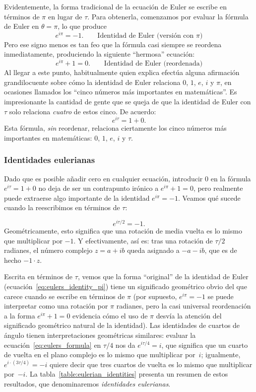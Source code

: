 Evidentemente, la forma tradicional de la ecuación de Euler se escribe en términos de $\pi$ en lugar de $\tau$. Para obtenerla, comenzamos por evaluar la fórmula de Euler en $\theta = \pi$, lo que produce
\begin{equation}
\label{eq:eulers_identity_pi}
e^{i\pi} = -1. \qquad\mbox{Identidad de Euler (versión con $\pi$)}
\end{equation}
Pero ese signo menos es tan feo que la fórmula casi siempre se reordena inmediatamente, produciendo la siguiente ``hermosa'' ecuación:
\[ e^{i\pi} + 1 = 0. \qquad\mbox{Identidad de Euler (reordenada)} \]
Al llegar a este punto, habitualmente quien explica efectúa alguna afirmación grandilocuente sobre cómo la identidad de Euler relaciona $0$, $1$, $e$, $i$ y $\pi$, en ocasiones llamados los ``cinco números más importantes en matemáticas''. Es impresionante la cantidad de gente que se queja de que la identidad de Euler con $\tau$ solo relaciona \emph{cuatro} de estos cinco. De acuerdo:
\[ e^{i\tau} = 1 + 0. \]
Esta fórmula, \emph{sin} reordenar, relaciona ciertamente los cinco números más importantes en matemáticas: $0$, $1$, $e$, $i$ y $\tau$.

      \subsubsection{Identidades eulerianas} %
      \label{sec:eulerian_identities}

Dado que es posible añadir cero en cualquier ecuación, introducir $0$ en la fórmula $e^{i\tau} = 1 + 0$ no deja de ser un contrapunto irónico a $e^{i\pi} + 1 = 0$, pero realmente puede extraerse algo importante de la identidad $e^{i\pi} = -1$. Veamos qué sucede cuando la reescribimos en términos de $\tau$:

\[
e^{i\tau/2} = -1.
\]
Geométricamente, esto significa que una rotación de media vuelta es lo mismo que multiplicar por $-1$. Y efectivamente, así es: tras una rotación de $\tau/2$ radianes, el número complejo $z = a + ib$ queda asignado a $-a - ib$, que es de hecho $-1\cdot z$.

Escrita en términos de $\tau$, vemos que la forma ``original'' de la identidad de Euler (ecuación~\eqref{eq:eulers_identity_pi}) tiene un significado geométrico obvio del que carece cuando se escribe en términos de $\pi$ (por supuesto, $e^{i\pi} = -1$ se puede interpretar como una rotación por $\pi$ radianes, pero la casi universal reordenación a la forma $e^{i\pi} + 1 = 0$ evidencia cómo el uso de $\pi$ desvía la atención del significado geométrico natural de la identidad). Las identidades de cuartos de ángulo tienen interpretaciones geométricas similares: evaluar la ecuación~\eqref{eq:eulers_formula} en $\tau/4$ nos da $e^{i\tau/4} = i$, que significa que un cuarto de vuelta en el plano complejo es lo mismo que multiplicar por~$i$; igualmente, $e^{i\cdot(3\tau/4)} = -i$ quiere decir que tres cuartos de vuelta es lo mismo que multiplicar por~$-i$. La tabla~\ref{table:eulerian_identities} presenta un resumen de estos resultados, que denominaremos \emph{identidades eulerianas}.


